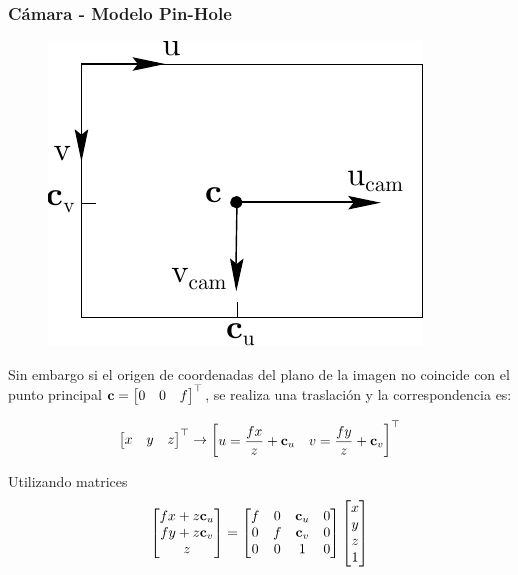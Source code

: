 \begin{frame}
    \frametitle{Cámara - Modelo Pin-Hole}   
    \footnotesize
    
    \begin{figure}[!h]
        \includegraphics[width=0.2\columnwidth]{images/camera/principal_point_coordinates.pdf}
    \end{figure}

    Sin embargo si el origen de coordenadas del plano de la imagen no coincide con el punto principal $\boldsymbol{\mathbf{c}} = \begin{bmatrix}0 & 0 & f\end{bmatrix}^{\top}$, se realiza una traslación y la correspondencia es:
    
    \begin{equation}
        \begin{bmatrix}x & y & z\end{bmatrix}^{\top} \rightarrow  \begin{bmatrix} u=\dfrac{fx}{z} + \boldsymbol{\mathbf{c}}_{u}& v=\dfrac{fy}{z} + \boldsymbol{\mathbf{c}}_{v}\end{bmatrix}^{\top}
    \end{equation}

    Utilizando matrices
    \begin{equation}
    \begin{bmatrix}
        fx+z\boldsymbol{\mathbf{c}}_{u}\\
        fy+z\boldsymbol{\mathbf{c}}_{v}\\
        z
    \end{bmatrix}
    =
    \begin{bmatrix}
        f & 0 & \boldsymbol{\mathbf{c}}_{u} & 0\\
        0 & f & \boldsymbol{\mathbf{c}}_{v} & 0\\
        0 & 0 & 1 & 0
    \end{bmatrix}
    \begin{bmatrix}
        x\\
        y\\
        z\\
        1
    \end{bmatrix}
    \end{equation}
\end{frame}


